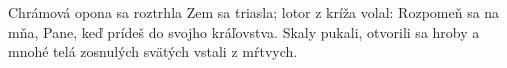 Chrámová opona sa roztrhla
\versseparator
Zem sa triasla; lotor z kríža volal: Rozpomeň sa na mňa, Pane, keď prídeš do svojho kráľovstva.
\versseparator
Skaly pukali, otvorili sa hroby a mnohé telá zosnulých svätých vstali z mŕtvych.